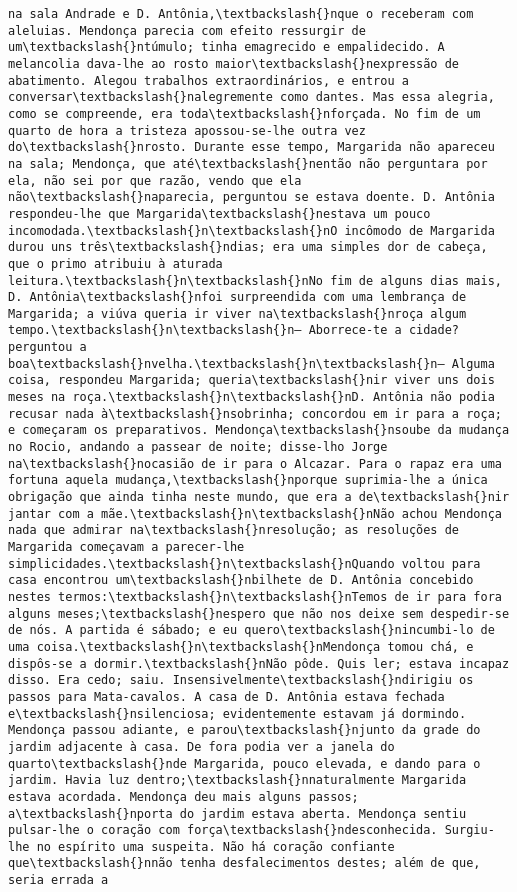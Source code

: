 \documentclass[11pt]{article}
\begin{document}
\begin{Verbatim}[commandchars=\\\{\}]
na sala Andrade e D. Antônia,\textbackslash{}nque o receberam com aleluias. Mendonça parecia com efeito ressurgir de um\textbackslash{}ntúmulo; tinha emagrecido e empalidecido. A melancolia dava-lhe ao rosto maior\textbackslash{}nexpressão de abatimento. Alegou trabalhos extraordinários, e entrou a conversar\textbackslash{}nalegremente como dantes. Mas essa alegria, como se compreende, era toda\textbackslash{}nforçada. No fim de um quarto de hora a tristeza apossou-se-lhe outra vez do\textbackslash{}nrosto. Durante esse tempo, Margarida não apareceu na sala; Mendonça, que até\textbackslash{}nentão não perguntara por ela, não sei por que razão, vendo que ela não\textbackslash{}naparecia, perguntou se estava doente. D. Antônia respondeu-lhe que Margarida\textbackslash{}nestava um pouco incomodada.\textbackslash{}n\textbackslash{}nO incômodo de Margarida durou uns três\textbackslash{}ndias; era uma simples dor de cabeça, que o primo atribuiu à aturada leitura.\textbackslash{}n\textbackslash{}nNo fim de alguns dias mais, D. Antônia\textbackslash{}nfoi surpreendida com uma lembrança de Margarida; a viúva queria ir viver na\textbackslash{}nroça algum tempo.\textbackslash{}n\textbackslash{}n— Aborrece-te a cidade? perguntou a boa\textbackslash{}nvelha.\textbackslash{}n\textbackslash{}n— Alguma coisa, respondeu Margarida; queria\textbackslash{}nir viver uns dois meses na roça.\textbackslash{}n\textbackslash{}nD. Antônia não podia recusar nada à\textbackslash{}nsobrinha; concordou em ir para a roça; e começaram os preparativos. Mendonça\textbackslash{}nsoube da mudança no Rocio, andando a passear de noite; disse-lho Jorge na\textbackslash{}nocasião de ir para o Alcazar. Para o rapaz era uma fortuna aquela mudança,\textbackslash{}nporque suprimia-lhe a única obrigação que ainda tinha neste mundo, que era a de\textbackslash{}nir jantar com a mãe.\textbackslash{}n\textbackslash{}nNão achou Mendonça nada que admirar na\textbackslash{}nresolução; as resoluções de Margarida começavam a parecer-lhe simplicidades.\textbackslash{}n\textbackslash{}nQuando voltou para casa encontrou um\textbackslash{}nbilhete de D. Antônia concebido nestes termos:\textbackslash{}n\textbackslash{}nTemos de ir para fora alguns meses;\textbackslash{}nespero que não nos deixe sem despedir-se de nós. A partida é sábado; e eu quero\textbackslash{}nincumbi-lo de uma coisa.\textbackslash{}n\textbackslash{}nMendonça tomou chá, e dispôs-se a dormir.\textbackslash{}nNão pôde. Quis ler; estava incapaz disso. Era cedo; saiu. Insensivelmente\textbackslash{}ndirigiu os passos para Mata-cavalos. A casa de D. Antônia estava fechada e\textbackslash{}nsilenciosa; evidentemente estavam já dormindo. Mendonça passou adiante, e parou\textbackslash{}njunto da grade do jardim adjacente à casa. De fora podia ver a janela do quarto\textbackslash{}nde Margarida, pouco elevada, e dando para o jardim. Havia luz dentro;\textbackslash{}nnaturalmente Margarida estava acordada. Mendonça deu mais alguns passos; a\textbackslash{}nporta do jardim estava aberta. Mendonça sentiu pulsar-lhe o coração com força\textbackslash{}ndesconhecida. Surgiu-lhe no espírito uma suspeita. Não há coração confiante que\textbackslash{}nnão tenha desfalecimentos destes; além de que, seria errada a 
\end{Verbatim}
\end{document}

